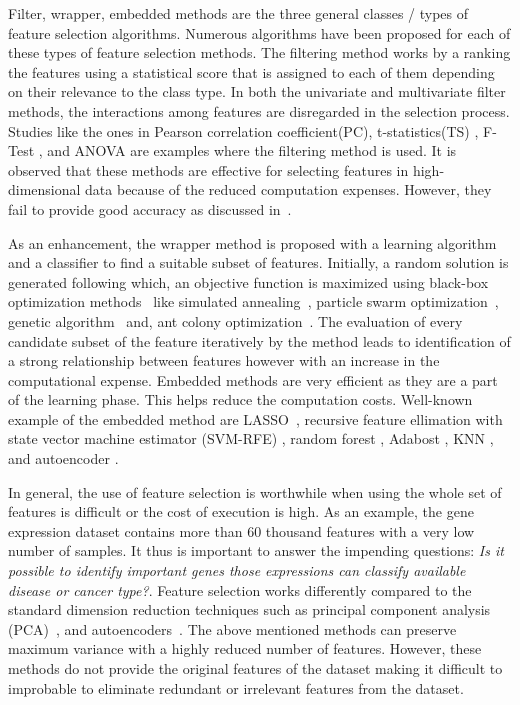 \documentclass{bioinfo}
\begin{document}
Filter, wrapper, embedded methods are the three general classes / types of feature selection algorithms. 
Numerous algorithms have been proposed for each of these types of feature selection methods. 
The filtering method works by a ranking the features using a statistical score that is assigned to each of them depending on their relevance to the class type. 
In both the univariate and multivariate filter methods, the interactions among features are disregarded in the selection process. 
Studies like the ones in Pearson correlation coefficient(PC), t-statistics(TS) \citep{speed2003statistical}, F-Test \citep{ding2005minimum}, and ANOVA \citep{ding2015identification} are examples where the filtering method is used. 
It is observed that these methods are effective for selecting features in high-dimensional data because of the reduced computation expenses. 
However, they fail to provide good accuracy as discussed in~\citep{sun2018cross}.

 
As an enhancement, the wrapper method is proposed with a learning algorithm and a classifier to find a suitable subset of features. 
Initially, a random solution is generated following which, an objective function is maximized using black-box optimization methods~\citep{rau2019exploring} like simulated annealing~\citep{jeong2018feature}, particle swarm optimization~\citep{xue2012particle}, genetic algorithm~\citep{wu2011feature} and, ant colony optimization~\citep{kabir2012new}. 
The evaluation of every candidate subset of the feature iteratively by the method leads to identification of a strong relationship between features however with an increase in the computational expense. 
Embedded methods are very efficient as they are a part of the learning phase. 
This helps reduce the computation costs. 
Well-known example of the embedded method are LASSO~\citep{tibshirani1996regression}, recursive feature ellimation with state vector machine estimator (SVM-RFE) \citep{abdullah2019, guyon2002gene, fang2019tightly}, random forest \citep{pouyan2018random, ram2017classification}, Adabost \citep{wang2012adaboost}, KNN \citep{le2019statistical}, and autoencoder \citep{lu2019autoencoder}.


In general, the use of feature selection is worthwhile when using the whole set of features is difficult or the cost of execution is high. 
As an example, the gene expression dataset contains more than 60 thousand features with a very low number of samples. 
It thus is important to answer the impending questions: \textit{Is it possible to identify important genes those expressions can classify available disease or cancer type?}. 
Feature selection works differently compared to the standard dimension reduction techniques such as principal component analysis (PCA)~\citep{hotelling1933analysis}, and autoencoders~\citep{hinton2006reducing}. 
The above mentioned methods can preserve maximum variance with a highly reduced number of features. 
However, these methods do not provide the original features of the dataset making it difficult to improbable to eliminate redundant or irrelevant features from the dataset. 
\end{document}
